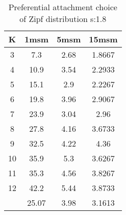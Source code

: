 \begin{table}[H]
\centering
\begin{tabular}{c|ccc}
K &1msm &5msm &15msm\\
\hline
3 & 7.3 & 2.68 & 1.8667\\
4 & 10.9 & 3.54 & 2.2933\\
5 & 15.1 & 2.9 & 2.2267\\
6 & 19.8 & 3.96 & 2.9067\\
7 & 23.9 & 3.04 & 2.96\\
8 & 27.8 & 4.16 & 3.6733\\
9 & 32.5 & 4.22 & 4.36\\
10 & 35.9 & 5.3 & 3.6267\\
11 & 35.3 & 4.56 & 3.8267\\
12 & 42.2 & 5.44 & 3.8733\\
\hline
& 25.07 & 3.98 & 3.1613\\
\end{tabular}
\caption{Preferential attachment choice of Zipf distribution s:1.8}
\label{tab:s1.8}
\end{table}
